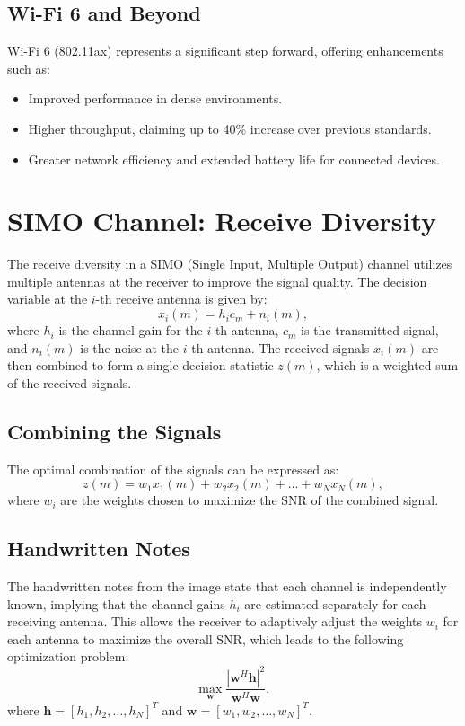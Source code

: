 \subsection*{Wi-Fi 6 and Beyond}
Wi-Fi 6 (802.11ax) represents a significant step forward, offering enhancements such as:
\begin{itemize}
    \item Improved performance in dense environments.
    \item Higher throughput, claiming up to 40\% increase over previous standards.
    \item Greater network efficiency and extended battery life for connected devices.
\end{itemize}




\section*{SIMO Channel: Receive Diversity}

The receive diversity in a SIMO (Single Input, Multiple Output) channel utilizes multiple antennas at the receiver to improve the signal quality. The decision variable at the \(i\)-th receive antenna is given by:
\begin{equation}
    x_i(m) = h_i c_m + n_i(m),
\end{equation}
where \( h_i \) is the channel gain for the \(i\)-th antenna, \( c_m \) is the transmitted signal, and \( n_i(m) \) is the noise at the \(i\)-th antenna. The received signals \( x_i(m) \) are then combined to form a single decision statistic \( z(m) \), which is a weighted sum of the received signals. 

\subsection*{Combining the Signals}
The optimal combination of the signals can be expressed as:
\begin{equation}
    z(m) = w_1 x_1(m) + w_2 x_2(m) + \ldots + w_N x_N(m),
\end{equation}
where \( w_i \) are the weights chosen to maximize the SNR of the combined signal.

\subsection*{Handwritten Notes}
The handwritten notes from the image state that each channel is independently known, implying that the channel gains \( h_i \) are estimated separately for each receiving antenna. This allows the receiver to adaptively adjust the weights \( w_i \) for each antenna to maximize the overall SNR, which leads to the following optimization problem:
\begin{equation}
    \max_{\mathbf{w}} \frac{|\mathbf{w}^H \mathbf{h}|^2}{\mathbf{w}^H \mathbf{w}},
\end{equation}
where \( \mathbf{h} = [h_1, h_2, \ldots, h_N]^T \) and \( \mathbf{w} = [w_1, w_2, \ldots, w_N]^T \).

